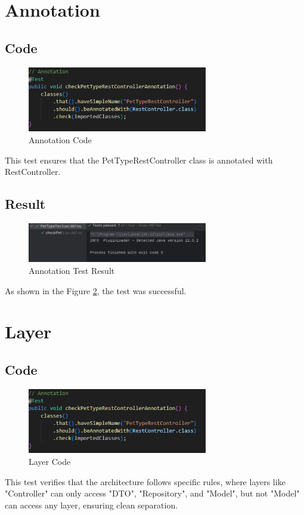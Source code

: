 \documentclass[a4paper,11pt,openright,BCOR=15mm]{scrbook}
\begin{document}
	\section{Annotation}
	\subsection{Code}
	\begin{figure}[H]
		\centering
		\includegraphics[width=0.7\textwidth]{figs/Architectural Compliance/AnnotationCode.png}
		\caption{Annotation Code}
		\label{fig:Annotation-Code}
	\end{figure}
	This test ensures that the PetTypeRestController class is annotated with RestController.
	\subsection{Result}		
	\begin{figure}[H]
		\centering
		\includegraphics[width=0.7\textwidth]{figs/Architectural Compliance/Annotation.png}
		\caption{Annotation Test Result}
		\label{fig:Annotation}
	\end{figure}
	As shown in the Figure \ref{fig:Annotation}, the test was successful.




	\section{Layer}
	\subsection{Code}
	\begin{figure}[H]
		\centering
		\includegraphics[width=0.7\textwidth]{figs/Architectural Compliance/Layer Code.png}
		\caption{Layer Code}
		\label{fig:Layer-Code}
	\end{figure}
	This test verifies that the architecture follows specific rules, where layers like "Controller" can only access "DTO", "Repository", and "Model", but not "Model" can access any layer, ensuring clean separation.
\end{document}

